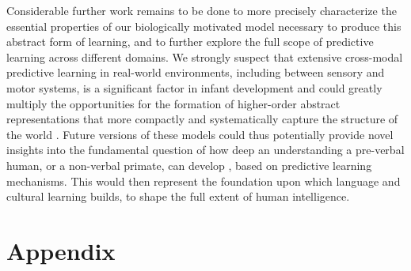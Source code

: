 \documentclass[11pt,twoside]{article}
\newif\myifpdf
\begin{document}
Considerable further work remains to be done to more precisely characterize the essential properties of our biologically motivated model necessary to produce this abstract form of learning, and to further explore the full scope of predictive learning across different domains.  We strongly suspect that extensive cross-modal predictive learning in real-world environments, including between sensory and motor systems, is a significant factor in infant development and could greatly multiply the opportunities for the formation of higher-order abstract representations that more compactly and systematically capture the structure of the world \citep{YuSmith12}.  Future versions of these models could thus potentially provide novel insights into the fundamental question of how deep an understanding a pre-verbal human, or a non-verbal primate, can develop \citep{SpelkeBreinlingerMacomberEtAl92,ElmanBatesKarmiloff-SmithEtAl96}, based on predictive learning mechanisms.  This would then represent the foundation upon which language and cultural learning builds, to shape the full extent of human intelligence.

\clearpage


\section{Appendix}



\clearpage


\end{document}
